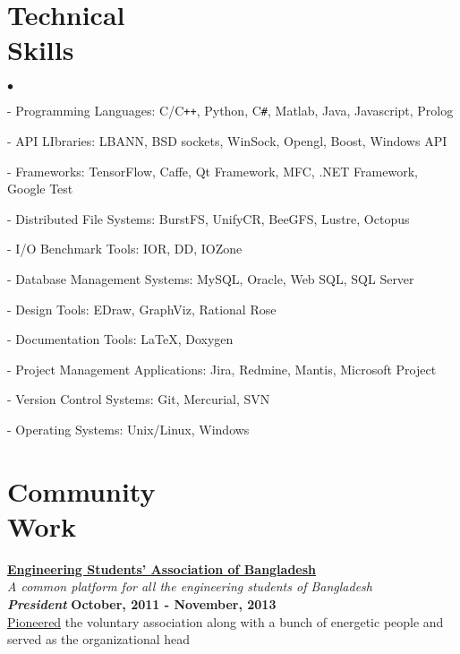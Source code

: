 \documentclass[margin,line]{res}
\newenvironment{list2}{
  \begin{list}{$\bullet$}{%
      \setlength{\itemsep}{0in}
      \setlength{\parsep}{0in} \setlength{\parskip}{0in}
      \setlength{\topsep}{0in} \setlength{\partopsep}{0in} 
      \setlength{\leftmargin}{0.2in}}}{\end{list}}
\begin{document}
\begin{resume}
\vspace*{-.1in}

\section{\sc Technical \\Skills}
\begin{list2}
\item[ - ] Programming Languages: C/C\texttt{++}, Python, C\texttt{\#}, Matlab, Java, Javascript, Prolog
\item[ - ] API LIbraries: LBANN, BSD sockets, WinSock, Opengl, Boost, Windows API
\item[ - ] Frameworks: TensorFlow, Caffe, Qt Framework, MFC, .NET Framework, Google Test
\item[ - ] Distributed File Systems: BurstFS, UnifyCR, BeeGFS, Lustre, Octopus
\item[ - ] I/O Benchmark Tools: IOR, DD, IOZone
\item[ - ] Database Management Systems: MySQL, Oracle, Web SQL, SQL Server
\item[ - ] Design Tools: EDraw, GraphViz, Rational Rose
\item[ - ] Documentation Tools: \LaTeX, Doxygen
\item[ - ] Project Management Applications: Jira, Redmine, Mantis, Microsoft Project
\item[ - ] Version Control Systems: Git, Mercurial, SVN
\item[ - ] Operating Systems: Unix/Linux, Windows
\end{list2}

\vspace*{-.1in}

\section{\sc Community \\Work}
{\bf \href{http://www.esab.org.bd/}{Engineering Students' Association of Bangladesh}} \\
\textit{A common platform for all the engineering students of Bangladesh \\}
\textbf{{\em President}} \hfill {\bf October, 2011 - November, 2013}\\
\href{https://www.youtube.com/watch?v=2GRKcrF47gM}{Pioneered} the voluntary association along with a bunch of energetic people and served as the organizational head

\vspace*{-.1in}


\end{resume}
\end{document}
